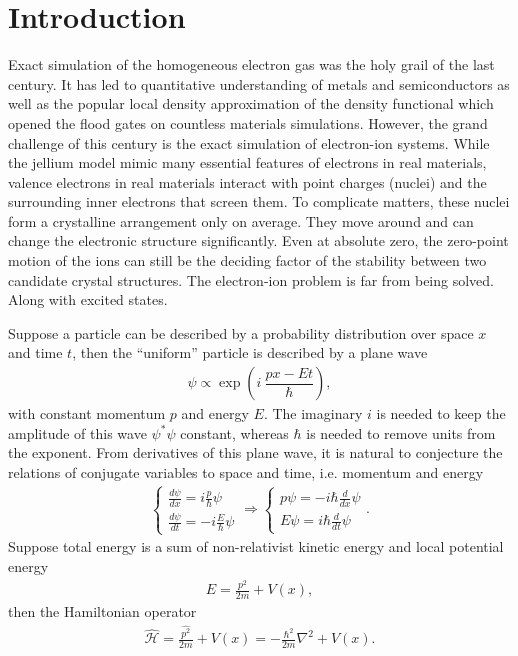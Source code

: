\chapter{Introduction}

Exact simulation of the homogeneous electron gas was the holy grail of the last century. It has led to quantitative understanding of metals and semiconductors as well as the popular local density approximation of the density functional which opened the flood gates on countless materials simulations. However, the grand challenge of this century is the exact simulation of electron-ion systems.
While the jellium model mimic many essential features of electrons in real materials, valence electrons in real materials interact with point charges (nuclei) and the surrounding inner electrons that screen them.
To complicate matters, these nuclei form a crystalline arrangement only on average. They move around and can change the electronic structure significantly. Even at absolute zero, the zero-point motion of the ions can still be the deciding factor of the stability between two candidate crystal structures.
The electron-ion problem is far from being solved.
Along with excited states.

Suppose a particle can be described by a probability distribution over space $x$ and time $t$, then the ``uniform'' particle is described by a plane wave
\begin{align}
\psi \propto \exp\left(
i~\dfrac{px-Et}{\hbar}
\right),
\end{align}
with constant momentum $p$ and energy $E$. The imaginary $i$ is needed to keep the amplitude of this wave $\psi^*\psi$ constant, whereas $\hbar$ is needed to remove units from the exponent. From derivatives of this plane wave, it is natural to conjecture the relations of conjugate variables to space and time, i.e. momentum and energy
\begin{align}
\left\{
\begin{array}{l}
\frac{d\psi}{dx} =  i\frac{p}{\hbar}\psi \\ [8 pt]
\frac{d\psi}{dt} = -i\frac{E}{\hbar}\psi
\end{array}
\right. \Rightarrow
\left\{
\begin{array}{l}
p\psi = -i\hbar\frac{d}{dx} \psi \\ [8 pt]
E\psi =  i\hbar\frac{d}{dt} \psi
\end{array}
\right..
\end{align}
Suppose total energy is a sum of non-relativist kinetic energy and local potential energy
\begin{align}
E = \frac{p^2}{2m} + V(x),
\end{align}
then the Hamiltonian operator
\begin{align}
\hat{\mathcal{H}} = \frac{\hat{p^2}}{2m} + V(x) = -\frac{\hbar^2}{2m}\nabla^2 + V(x).
\end{align}

